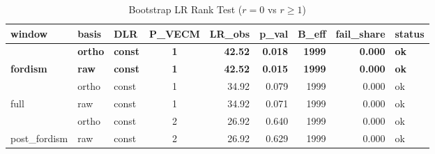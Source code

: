 \begin{table}[!h]
\centering
\caption{\label{tab:tab:rank_bootstrap}Bootstrap LR Rank Test ($r = 0$ vs $r \ge 1$)}
\centering
\fontsize{10}{12}\selectfont
\begin{tabular}[t]{lllcrrrrl}
\toprule
window & basis & DLR & P_VECM & LR_obs & p_val & B_eff & fail_share & status\\
\midrule
 & \textbf{ortho} & \textbf{const} & \textbf{1} & \textbf{42.52} & \textbf{0.018} & \textbf{1999} & \textbf{0.000} & \textbf{ok}\\

\multirow{-2}{*}{\raggedright\arraybackslash \textbf{fordism}} & \textbf{raw} & \textbf{const} & \textbf{1} & \textbf{42.52} & \textbf{0.015} & \textbf{1999} & \textbf{0.000} & \textbf{ok}\\
\cmidrule{1-9}
 & ortho & const & 1 & 34.92 & 0.079 & 1999 & 0.000 & ok\\

\multirow{-2}{*}{\raggedright\arraybackslash full} & raw & const & 1 & 34.92 & 0.071 & 1999 & 0.000 & ok\\
\cmidrule{1-9}
 & ortho & const & 2 & 26.92 & 0.640 & 1999 & 0.000 & ok\\

\multirow{-2}{*}{\raggedright\arraybackslash post_fordism} & raw & const & 2 & 26.92 & 0.629 & 1999 & 0.000 & ok\\
\bottomrule
\end{tabular}
\end{table}
